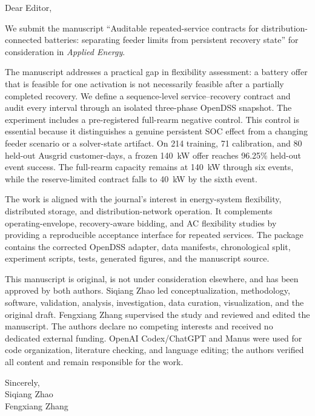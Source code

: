 \documentclass[11pt]{article}
\begin{document}
\sloppy

\noindent Dear Editor,

\medskip

We submit the manuscript ``Auditable repeated-service contracts for distribution-connected batteries: separating feeder limits from persistent recovery state'' for consideration in \emph{Applied Energy}.

The manuscript addresses a practical gap in flexibility assessment: a battery offer that is feasible for one activation is not necessarily feasible after a partially completed recovery. We define a sequence-level service--recovery contract and audit every interval through an isolated three-phase OpenDSS snapshot. The experiment includes a pre-registered full-rearm negative control. This control is essential because it distinguishes a genuine persistent SOC effect from a changing feeder scenario or a solver-state artifact. On 214 training, 71 calibration, and 80 held-out Ausgrid customer-days, a frozen \SI{140}{kW} offer reaches 96.25\% held-out event success. The full-rearm capacity remains at \SI{140}{kW} through six events, while the reserve-limited contract falls to \SI{40}{kW} by the sixth event.

The work is aligned with the journal's interest in energy-system flexibility, distributed storage, and distribution-network operation. It complements operating-envelope, recovery-aware bidding, and AC flexibility studies by providing a reproducible acceptance interface for repeated services. The package contains the corrected OpenDSS adapter, data manifests, chronological split, experiment scripts, tests, generated figures, and the manuscript source.

This manuscript is original, is not under consideration elsewhere, and has been approved by both authors. Siqiang Zhao led conceptualization, methodology, software, validation, analysis, investigation, data curation, visualization, and the original draft. Fengxiang Zhang supervised the study and reviewed and edited the manuscript. The authors declare no competing interests and received no dedicated external funding. OpenAI Codex/ChatGPT and Manus were used for code organization, literature checking, and language editing; the authors verified all content and remain responsible for the work.

\medskip

Sincerely,\\
Siqiang Zhao\\
Fengxiang Zhang
\end{document}
